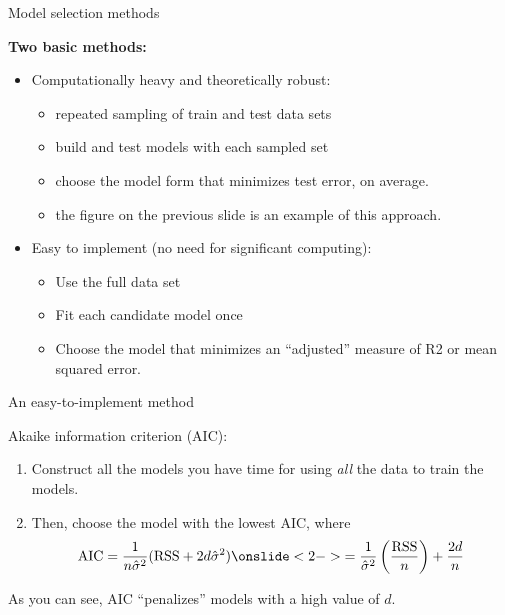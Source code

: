 \documentclass[aspectratio=169]{beamer}
\begin{document}
\begin{frame}{Model selection methods}

\textbf{Two basic methods:}
\vspace{5mm}
\begin{itemize}
\item Computationally heavy and theoretically robust: 
\begin{itemize}
\item repeated sampling of train and test data sets
\item build and test models with each sampled set
\item choose the model form that minimizes test error, on average.
\item the figure on the previous slide is an example of this approach.
\end{itemize}
\vspace{5mm}
\item Easy to implement (no need for significant computing):
\begin{itemize}
\item Use the full data set
\item Fit each candidate model once
\item Choose the model that minimizes an ``adjusted'' measure of R2 or mean squared error.
\end{itemize}
\end{itemize}
\end{frame}

\begin{frame}{An easy-to-implement method}

Akaike information criterion (AIC):

\begin{enumerate}
\item Construct all the models you have time for using \textit{all} the data to train the models.
\item Then, choose the model with the lowest AIC, where
\begin{align*}
\text{AIC} = \frac{1}{n\hat{\sigma}^2}(\text{RSS}+2d\hat{\sigma}^2) \onslide<2->{= \frac{1}{\hat{\sigma}^2}\left(\frac{\text{RSS}}{n}\right) + \frac{2d}{n}}
\end{align*}
\end{enumerate}

\pause
As you can see, AIC ``penalizes'' models with a high value of $d$.  
\end{frame}
\end{document}
